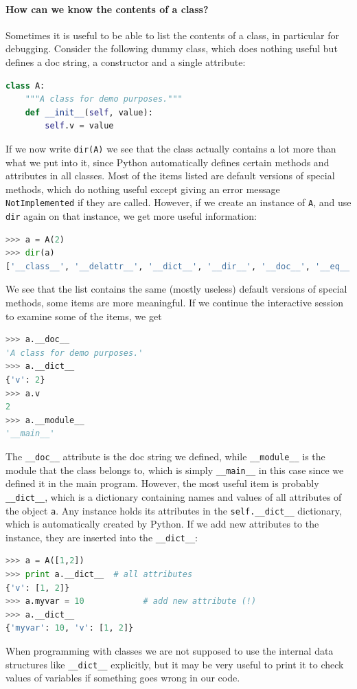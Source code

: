 \documentclass[graybox,envcountchap,sectrefs,final]{svmonodo}
\begin{document}
\paragraph{How can we know the contents of a class?}
Sometimes it is useful to be able to list the contents of a class, in particular
for debugging. Consider the following dummy class, which does nothing useful but
defines a doc string, a constructor and a single attribute:
\begin{lstlisting}[language=Python,style=blue1]
 class A:
    """A class for demo purposes."""
    def __init__(self, value):
        self.v = value
\end{lstlisting}
If we now write \texttt{dir(A)} we see that the class actually contains a lot more than what we put into it,
since Python automatically defines certain methods and attributes in all classes. Most of the items
listed are default versions of special methods, which do nothing useful except giving an
error message \texttt{NotImplemented} if they are called. However, if we create an instance of \texttt{A}, and
use \texttt{dir} again on that instance, we get more useful information:
\begin{lstlisting}[language=Python,style=blue1]
>>> a = A(2)
>>> dir(a)
['__class__', '__delattr__', '__dict__', '__dir__', '__doc__', '__eq__', '__format__', '__ge__', '__getattribute__', '__gt__', '__hash__', '__init__', '__init_subclass__', '__le__', '__lt__', '__module__', '__ne__', '__new__', '__reduce__', '__reduce_ex__', '__repr__', '__setattr__', '__sizeof__', '__str__', '__subclasshook__', '__weakref__', 'v']
\end{lstlisting}
We see that the list contains the same (mostly useless) default versions of special methods, some items are more meaningful. If we continue the interactive session to examine some of the items, we get
\begin{lstlisting}[language=Python,style=blue1]
>>> a.__doc__
'A class for demo purposes.'
>>> a.__dict__
{'v': 2}
>>> a.v
2
>>> a.__module__
'__main__'
\end{lstlisting}
The \Verb!__doc__! attribute is the doc string we defined, while \Verb!__module__! is the module that the
class belongs to, which is simply \Verb!__main__! in this case since we defined it in the main program.
However, the most useful item is probably \Verb!__dict__!, which is a dictionary containing names and
values of all attributes of the object \texttt{a}. Any instance holds its attributes in the
\Verb!self.__dict__! dictionary, which is automatically created by Python. If we add new
attributes to the instance, they are inserted into the \Verb!__dict__!:
\begin{lstlisting}[language=Python,style=blue1]
>>> a = A([1,2])
>>> print a.__dict__  # all attributes
{'v': [1, 2]}
>>> a.myvar = 10            # add new attribute (!)
>>> a.__dict__
{'myvar': 10, 'v': [1, 2]}
\end{lstlisting}
When programming with classes we are not supposed to use the internal data structures like \Verb!__dict__!
explicitly, but it may be very useful to print it to check values of variables if something goes
wrong in our code.
\end{document}

